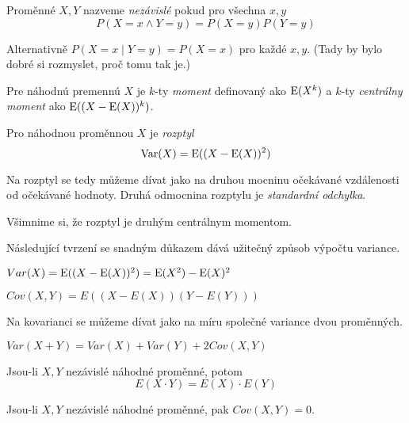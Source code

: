 {\begin{definition}
    Proměnné $X,Y$ nazveme {\em nezávislé} pokud pro všechna $x,y$
    \[
        P(X = x \land Y = y) = P(X = y) P(Y = y)
    \]
\end{definition}

Alternativně $P(X = x \mid Y = y) = P(X = x)$ pro každé $x,y$. (Tady by
bylo dobré si rozmyslet, proč tomu tak je.)

\begin{definition}[Momenty]
    Pre náhodnú premennú $X$ je $k$-ty {\em moment}
	definovaný ako $\operatorname{E}(X^k)$ a $k$-ty {\em centrálny moment}
	ako $\operatorname{E}((X-\operatorname{E}(X))^k)$.
\end{definition}

\begin{definition}
    Pro náhodnou proměnnou $X$ je {\em rozptyl}
    \[ \operatorname{Var}(X) = \operatorname{E}( (X - \operatorname{E}(X))^2 ) \]
\end{definition}

Na rozptyl se tedy můžeme dívat jako na druhou mocninu očekávané
vzdálenosti od očekávané hodnoty. Druhá odmocnina rozptylu je
{\em standardní odchylka}.

Všimnime si, že rozptyl je druhým centrálnym momentom.

Následující tvrzení se snadným důkazem dává užitečný způsob výpočtu
variance.

\begin{claim}
    $ Var(X) = \operatorname{E}( (X - \operatorname{E}(X))^2 ) = \operatorname{E}(X^2) - \operatorname{E}(X)^2 $
\end{claim}

\begin{definition}[Kovariance]
    $ Cov(X,Y) = E((X - E(X))(Y - E(Y))) $
\end{definition}

Na kovarianci se můžeme dívat jako na míru společné variance dvou
proměnných.

\begin{claim}
    $Var(X + Y) = Var(X) + Var(Y) + 2 Cov(X,Y)$
\end{claim}

\begin{theorem}
    Jsou-li $X, Y$ nezávislé náhodné proměnné, potom
    \[ E(X \cdot Y) = E(X) \cdot E(Y) \]
\end{theorem}


\begin{corollary}
    Jsou-li $X, Y$ nezávislé náhodné proměnné, pak $Cov(X,Y) = 0$.
\end{corollary}

}
